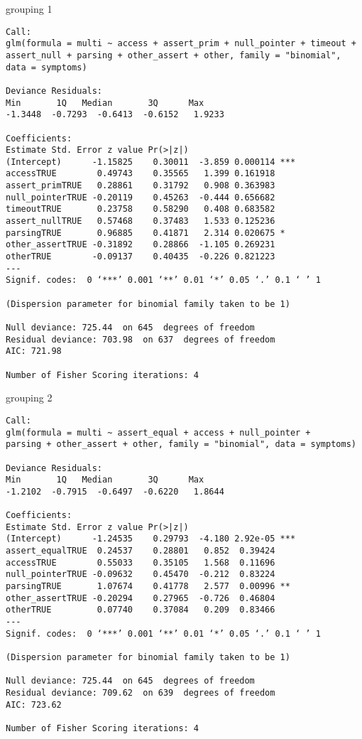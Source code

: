 grouping 1
\begin{lstlisting}[basicstyle=\tiny]
Call:
glm(formula = multi ~ access + assert_prim + null_pointer + timeout + 
assert_null + parsing + other_assert + other, family = "binomial", 
data = symptoms)

Deviance Residuals: 
Min       1Q   Median       3Q      Max  
-1.3448  -0.7293  -0.6413  -0.6152   1.9233  

Coefficients:
Estimate Std. Error z value Pr(>|z|)    
(Intercept)      -1.15825    0.30011  -3.859 0.000114 ***
accessTRUE        0.49743    0.35565   1.399 0.161918    
assert_primTRUE   0.28861    0.31792   0.908 0.363983    
null_pointerTRUE -0.20119    0.45263  -0.444 0.656682    
timeoutTRUE       0.23758    0.58290   0.408 0.683582    
assert_nullTRUE   0.57468    0.37483   1.533 0.125236    
parsingTRUE       0.96885    0.41871   2.314 0.020675 *  
other_assertTRUE -0.31892    0.28866  -1.105 0.269231    
otherTRUE        -0.09137    0.40435  -0.226 0.821223    
---
Signif. codes:  0 ‘***’ 0.001 ‘**’ 0.01 ‘*’ 0.05 ‘.’ 0.1 ‘ ’ 1

(Dispersion parameter for binomial family taken to be 1)

Null deviance: 725.44  on 645  degrees of freedom
Residual deviance: 703.98  on 637  degrees of freedom
AIC: 721.98

Number of Fisher Scoring iterations: 4
\end{lstlisting}

grouping 2
\begin{lstlisting}[basicstyle=\tiny]
Call:
glm(formula = multi ~ assert_equal + access + null_pointer + 
parsing + other_assert + other, family = "binomial", data = symptoms)

Deviance Residuals: 
Min       1Q   Median       3Q      Max  
-1.2102  -0.7915  -0.6497  -0.6220   1.8644  

Coefficients:
Estimate Std. Error z value Pr(>|z|)    
(Intercept)      -1.24535    0.29793  -4.180 2.92e-05 ***
assert_equalTRUE  0.24537    0.28801   0.852  0.39424    
accessTRUE        0.55033    0.35105   1.568  0.11696    
null_pointerTRUE -0.09632    0.45470  -0.212  0.83224    
parsingTRUE       1.07674    0.41778   2.577  0.00996 ** 
other_assertTRUE -0.20294    0.27965  -0.726  0.46804    
otherTRUE         0.07740    0.37084   0.209  0.83466    
---
Signif. codes:  0 ‘***’ 0.001 ‘**’ 0.01 ‘*’ 0.05 ‘.’ 0.1 ‘ ’ 1

(Dispersion parameter for binomial family taken to be 1)

Null deviance: 725.44  on 645  degrees of freedom
Residual deviance: 709.62  on 639  degrees of freedom
AIC: 723.62

Number of Fisher Scoring iterations: 4
\end{lstlisting}

